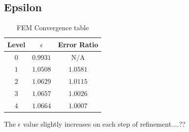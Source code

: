 \documentclass[a4paper, 11pt]{article}
\begin{document}
			\subsection{Epsilon}
				\begin{table}[H]
					\centering
					\begin{tabular}{c|c|c}
						\textbf{Level} 	& \textbf{$ \epsilon $} & \textbf{ Error Ratio}  \\ \hline
						$ 0  $			& $ 0.9931 $ 			& N/A \\ \hline
						$ 1  $			& $ 1.0508 $ 			& $ 1.0581 $ \\ \hline
						$ 2  $			& $ 1.0629 $ 			& $ 1.0115 $ \\ \hline
						$ 3  $			& $ 1.0657 $	 		& $ 1.0026 $ \\ \hline
						$ 4  $			& $ 1.0664 $ 			& $ 1.0007 $ \\ 
					\end{tabular}
					\caption{FEM Convergence table}
					\label{table:errors}
				\end{table}
				The $ \epsilon $ value slightly increases on each step of refinement....??
	
	
\end{document}
